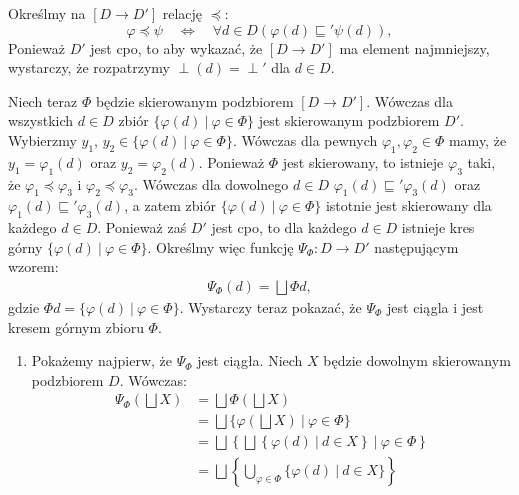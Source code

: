 \begin{dowod}
      Określmy na \([D\to D']\) relację  \(\preceq\):
\[
\varphi \preceq \psi\quad \Leftrightarrow\quad \forall d\in D \left(\varphi(d) \sqsubseteq' \psi(d)\right),
\]
Ponieważ \(D'\) jest cpo, to aby wykazać, że \([D\to D']\) ma element najmniejszy, wystarczy, że rozpatrzymy \(\perp(d)=\perp'\) dla \(d\in D\).

Niech teraz \(\Phi\) będzie skierowanym podzbiorem \([D\to D']\). 
      Wówczas  dla  wszystkich  \(d\in D\)  zbiór  \(\{\varphi(d)\  |\ \varphi\in\Phi\}\) jest  skierowanym podzbiorem  \(D'\). Wybierzmy \(y_1,\,y_2\in\{\varphi(d)\ |\ \varphi\in\Phi\}\). Wówczas dla pewnych \(\varphi_1, \varphi_2\in\Phi\) mamy, że \(y_1=\varphi_1(d)\) oraz \(y_2=\varphi_2(d)\). Ponieważ \(\Phi\) jest skierowany, to istnieje \(\varphi_3\) taki, że \(\varphi_1\preceq \varphi_3\) i \(\varphi_2\preceq \varphi_3\). Wówczas dla dowolnego \(d\in D\) \(\varphi_1(d) \sqsubseteq' \varphi_3(d)\) oraz \(\varphi_1(d) \sqsubseteq' \varphi_3(d)\), a zatem zbiór \(\{\varphi(d)\  |\ \varphi\in\Phi\}\) istotnie jest skierowany dla każdego \(d\in D\). Ponieważ zaś \(D'\) jest cpo, to dla każdego \(d\in D\) istnieje kres górny  \(\{\varphi(d)\  |\ \varphi\in\Phi\}\). Określmy więc funkcję \(\Psi_\Phi: D\to D'\) następującym wzorem:
      \begin{align*}
        \Psi_\Phi(d) = \bigsqcup \Phi d,
      \end{align*}
      gdzie \(\Phi d=\{\varphi(d)\ |\ \varphi \in \Phi\}\). Wystarczy teraz pokazać, że \(\Psi_\Phi\) jest ciągla i jest kresem górnym zbioru \(\Phi\).
      \begin{enumerate}
        \item Pokażemy najpierw, że \(\Psi_\Phi\) jest ciągła. Niech \(X\) będzie dowolnym skierowanym podzbiorem \(D\). Wówczas:
          \begin{align*}
  \Psi_\Phi(\bigsqcup X)&= \bigsqcup \Phi (\bigsqcup X)\\
                        &= \bigsqcup \{\varphi(\bigsqcup X)\ |\ \varphi\in\Phi\}\\
                        &= \bigsqcup \left\{\bigsqcup\left\{\varphi(d)\ |\ d\in X\right\}\ |\ \varphi\in \Phi\right\}\\
                        &= \bigsqcup \left\{\bigcup\limits_{\varphi\in\Phi}\{\varphi(d)\ |\ d\in X\}\right\}\\

\end{align*}
\end{enumerate}
\end{dowod}
